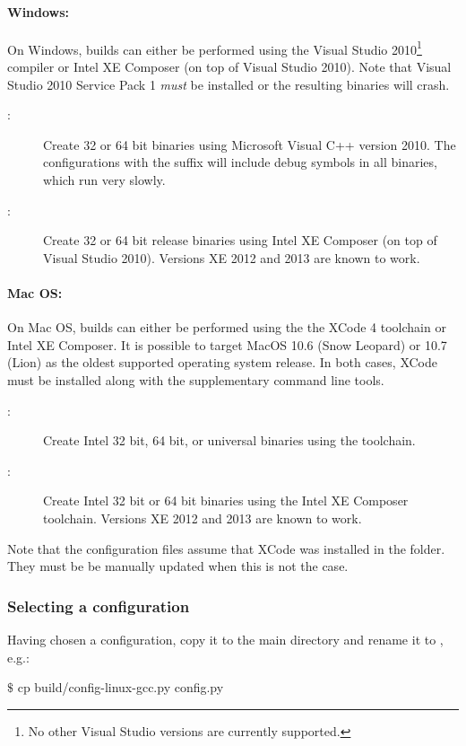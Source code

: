 \paragraph{Windows:}
On Windows, builds can either be performed using the Visual Studio 2010\footnote{No other Visual Studio versions are currently supported.}
compiler or Intel XE Composer (on top of Visual Studio 2010).
Note that Visual Studio 2010 Service Pack 1 \emph{must} be installed or the resulting binaries will crash.
\begin{description}
\item[:] Create 32 or 64 bit binaries using Microsoft Visual C++ version 2010.
The configurations with the suffix  will include debug symbols in all binaries, which run very slowly.
\item[:] Create 32 or 64 bit release binaries using Intel XE Composer (on top of Visual Studio 2010).
Versions XE 2012 and 2013 are known to work.
\end{description}
\paragraph{Mac OS:}
On Mac OS, builds can either be performed using the the XCode 4  toolchain or Intel XE Composer.
It is possible to target MacOS 10.6 (Snow Leopard) or 10.7 (Lion) as the oldest supported operating system release.
In both cases, XCode must be installed along with the supplementary command line tools.
\begin{description}
\item[:] Create Intel 32 bit, 64 bit, or universal binaries using the  toolchain.
\item[:] Create Intel 32 bit or 64 bit binaries using the Intel XE Composer toolchain.
Versions XE 2012 and 2013 are known to work.
\end{description}
Note that the configuration files assume that XCode was
installed in the  folder. They must be be manually updated
when this is not the case.
\subsubsection{Selecting a configuration}
Having chosen a configuration, copy it to the main directory and rename it to , e.g.:
\begin{shell}
$\texttt{\$}$ cp build/config-linux-gcc.py config.py
\end{shell}

